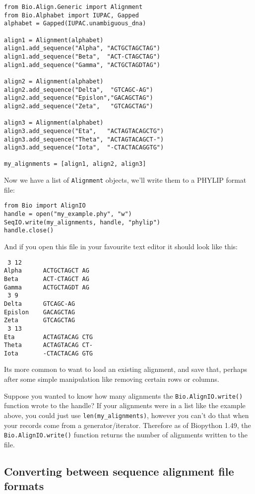 \documentclass{report}
\begin{document}
\begin{verbatim}
from Bio.Align.Generic import Alignment
from Bio.Alphabet import IUPAC, Gapped
alphabet = Gapped(IUPAC.unambiguous_dna)

align1 = Alignment(alphabet)
align1.add_sequence("Alpha", "ACTGCTAGCTAG")
align1.add_sequence("Beta",  "ACT-CTAGCTAG")
align1.add_sequence("Gamma", "ACTGCTAGDTAG")

align2 = Alignment(alphabet)
align2.add_sequence("Delta",  "GTCAGC-AG")
align2.add_sequence("Epislon","GACAGCTAG")
align2.add_sequence("Zeta",   "GTCAGCTAG")

align3 = Alignment(alphabet)
align3.add_sequence("Eta",   "ACTAGTACAGCTG")
align3.add_sequence("Theta", "ACTAGTACAGCT-")
align3.add_sequence("Iota",  "-CTACTACAGGTG")

my_alignments = [align1, align2, align3]
\end{verbatim}

\noindent Now we have a list of \verb|Alignment| objects, we'll write them to a PHYLIP format file:

\begin{verbatim}
from Bio import AlignIO
handle = open("my_example.phy", "w")
SeqIO.write(my_alignments, handle, "phylip")
handle.close()
\end{verbatim}

\noindent And if you open this file in your favourite text editor it should look like this:

\begin{verbatim}
 3 12
Alpha      ACTGCTAGCT AG
Beta       ACT-CTAGCT AG
Gamma      ACTGCTAGDT AG
 3 9
Delta      GTCAGC-AG
Epislon    GACAGCTAG
Zeta       GTCAGCTAG
 3 13
Eta        ACTAGTACAG CTG
Theta      ACTAGTACAG CT-
Iota       -CTACTACAG GTG
\end{verbatim}

Its more common to want to load an existing alignment, and save that, perhaps after some simple manipulation like removing certain rows or columns.

Suppose you wanted to know how many alignments the \verb|Bio.AlignIO.write()| function wrote to the handle? If your alignments were in a list like the example above, you could just use \verb|len(my_alignments)|, however you can't do that when your records come from a generator/iterator.  Therefore as of Biopython 1.49, the \verb|Bio.AlignIO.write()| function returns the number of alignments written to the file.   


\subsection{Converting between sequence alignment file formats}
\label{sec:converting-alignments}
\end{document}
